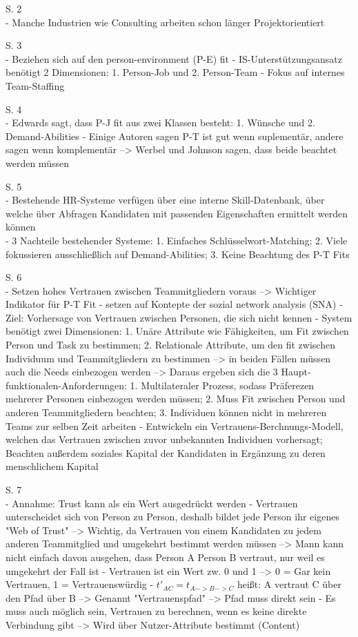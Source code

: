 S. 2\\
- Manche Industrien wie Consulting arbeiten schon länger Projektorientiert

S. 3\\
- Beziehen sich auf den person-environment (P-E) fit
- IS-Unterstützungsansatz benötigt 2 Dimensionen: 1. Person-Job und 2. Person-Team
- Fokus auf internes Team-Staffing

S. 4\\
- Edwards sagt, dass P-J fit aus zwei Klassen besteht: 1. Wünsche und 2. Demand-Abilities
- Einige Autoren sagen P-T ist gut wenn suplementär, andere sagen wenn komplementär --> Werbel und Johnson sagen, dass beide beachtet werden müssen

S. 5\\
- Bestehende HR-Systeme verfügen über eine interne Skill-Datenbank, über welche über Abfragen Kandidaten mit passenden Eigenschaften ermittelt werden können\\
- 3 Nachteile bestehender Systeme: 1. Einfaches Schlüsselwort-Matching; 2. Viele fokussieren ausschließlich auf Demand-Abilities; 3. Keine Beachtung des P-T Fits

S. 6\\
- Setzen hohes Vertrauen zwischen Teammitgliedern voraus --> Wichtiger Indikator für P-T Fit
- setzen auf Kontepte der sozial network analysis (SNA)
- Ziel: Vorhersage von Vertrauen zwischen Personen, die sich nicht kennen
- System benötigt zwei Dimensionen: 1. Unäre Attribute wie Fähigkeiten, um Fit zwischen Person und Task zu bestimmen; 2. Relationale Attribute, um den fit zwischen Individuum und Teammitgliedern zu bestimmen --> in beiden Fällen müssen auch die Needs einbezogen werden --> Daraus ergeben sich die 3 Haupt-funktionalen-Anforderungen: 1. Multilateraler Prozess, sodass Präferezen mehrerer Personen einbezogen werden müssen; 2. Muss Fit zwischen Person und anderen Teammitgliedern beachten; 3. Individuen können nicht in mehreren Teams zur selben Zeit arbeiten
- Entwickeln ein Vertrauens-Berchnungs-Modell, welchen das Vertrauen zwischen zuvor unbekannten Individuen vorhersagt; Beachten außerdem soziales Kapital der Kandidaten in Ergänzung zu deren menschlichem Kapital

S. 7\\
- Annahme: Trust kann als ein Wert ausgedrückt werden
- Vertrauen unterscheidet sich von Person zu Person, deshalb bildet jede Person ihr eigenes "Web of Trust" --> Wichtig, da Vertrauen von einem Kandidaten zu jedem anderen Teammitglied und umgekehrt bestimmt werden müssen --> Mann kann nicht einfach davon ausgehen, dass Person A Person B vertraut, nur weil es umgekehrt der Fall ist
- Vertrauen ist ein Wert zw. 0 und 1 --> 0 = Gar kein Vertrauen, 1 = Vertrauenswürdig
- $t'_{AC} = t_{A->B->C}$ heißt: A vertraut C über den Pfad über B --> Genannt "Vertrauenspfad" --> Pfad muss direkt sein
- Es muss auch möglich sein, Vertrauen zu berechnen, wenn es keine direkte Verbindung gibt --> Wird über Nutzer-Attribute bestimmt (Content)

